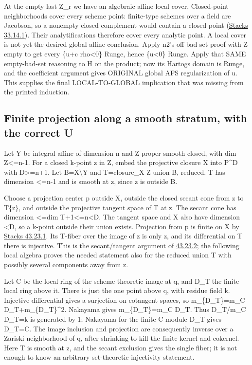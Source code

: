 \documentclass[
  10pt,
]{article}
\begin{document}
At the empty last Z\_r we have an algebraic affine local cover.
Closed-point neighborhoods cover every scheme point: finite-type schemes
over a field are Jacobson, so a nonempty closed complement would contain
a closed point (\href{https://stacks.math.columbia.edu/tag/0478}{Stacks
33.14.1}). Their analytifications therefore cover every analytic point.
A local cover is not yet the desired global affine conclusion. Apply
n2's off-bad-set proof with Z empty to get every \{u+c rho\textless0\}
Runge, hence \{u\textless0\} Runge. Apply that SAME empty-bad-set
reasoning to H on the product; now its Hartogs domain is Runge, and the
coefficient argument gives ORIGINAL global AFS regularization of u. This
supplies the final LOCAL-TO-GLOBAL implication that was missing from the
printed induction.

\subsection{Finite projection along a smooth stratum, with the correct
U}\label{finite-projection-along-a-smooth-stratum-with-the-correct-u}

Let Y be integral affine of dimension n and Z proper smooth closed, with
dim Z\textless=n-1. For a closed k-point z in Z, embed the projective
closure X into P\^{}D with D\textgreater=n+1. Let B=X\textbackslash Y
and T=closure\_X Z union B, reduced. T has dimension \textless=n-1 and
is smooth at z, since z is outside B.

Choose a projection center p outside X, outside the closed secant cone
from z to T\{z\}, and outside the projective tangent space of T at z.
The secant cone has dimension \textless=dim T+1\textless=n\textless D.
The tangent space and X also have dimension \textless D, so a k-point
outside their union exists. Projection from p is finite on X by
\href{https://stacks.math.columbia.edu/tag/0B1P}{Stacks 43.23.1}. Its
T-fiber over the image of z is only z, and its differential on T there
is injective. This is the secant/tangent argument of
\href{https://stacks.math.columbia.edu/tag/0B1Q}{43.23.2}; the following
local algebra proves the needed statement also for the reduced union T
with possibly several components away from z.

Let C be the local ring of the scheme-theoretic image at q, and D\_T the
finite local ring above it. There is just the one point above q, with
residue field k. Injective differential gives a surjection on cotangent
spaces, so m\_\{D\_T\}=m\_C D\_T+m\_\{D\_T\}\^{}2. Nakayama gives
m\_\{D\_T\}=m\_C D\_T. Thus D\_T/m\_C D\_T=k is generated by 1; Nakayama
for the finite C-module D\_T gives D\_T=C. The image inclusion and
projection are consequently inverse over a Zariski neighborhood of q,
after shrinking to kill the finite kernel and cokernel. Here T is smooth
at z, and the secant exclusion gives the single fiber; it is not enough
to know an arbitrary set-theoretic injectivity statement.
\end{document}
